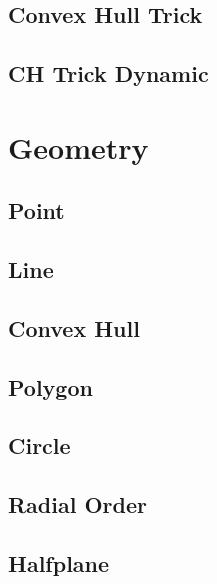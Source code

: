\subsection{Convex Hull Trick}
\raggedbottom
\hrulefill
\subsection{CH Trick Dynamic}
\raggedbottom
\hrulefill

\section{Geometry}
\subsection{Point}
\raggedbottom
\hrulefill
\subsection{Line}
\raggedbottom
\hrulefill
\subsection{Convex Hull}
\raggedbottom
\hrulefill
\subsection{Polygon}
\raggedbottom
\hrulefill
\subsection{Circle}
\raggedbottom
\hrulefill
\subsection{Radial Order}
\raggedbottom
\hrulefill
\subsection{Halfplane}
\raggedbottom
\hrulefill
